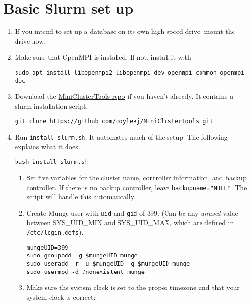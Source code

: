 \section{Basic Slurm set up} \label{sec:basicslurm}

\begin{enumerate}
  \item If you intend to set up a database on its own high speed drive, mount the drive now. %

  \item Make sure that OpenMPI is installed. If not, install it with

    \texttt{sudo apt install libopenmpi2 libopenmpi-dev openmpi-common openmpi-doc}

  \item Download the \href{https://github.com/coyleej/MiniClusterTools}{MiniClusterTools repo} if you haven't already. It contains a slurm installation script.

    \texttt{git clone https://github.com/coyleej/MiniClusterTools.git}

  \item Run \texttt{install\_slurm.sh}. It automates much of the setup. The following explains what it does.

    \texttt{bash install\_slurm.sh}

    \begin{enumerate}
      \item Set five variables for the cluster name, controller information, and backup controller. If there is no backup controller, leave \texttt{backupname="NULL"}. The script will handle this automatically.

      \item Create Munge user with \texttt{uid} and \texttt{gid} of 399. (Can be any \emph{unused} value between SYS\_UID\_MIN and SYS\_UID\_MAX, which are defined in \texttt{/etc/login.defs}). 

        \texttt{mungeUID=399} \\
        \texttt{sudo groupadd -g \$mungeUID munge} \\
        \texttt{sudo useradd -r -u \$mungeUID -g \$mungeUID munge} \\
        \texttt{sudo usermod -d /nonexistent munge}

      \item Make sure the system clock is set to the proper timezone and that your system clock is correct:


\end{enumerate}
\end{enumerate}
